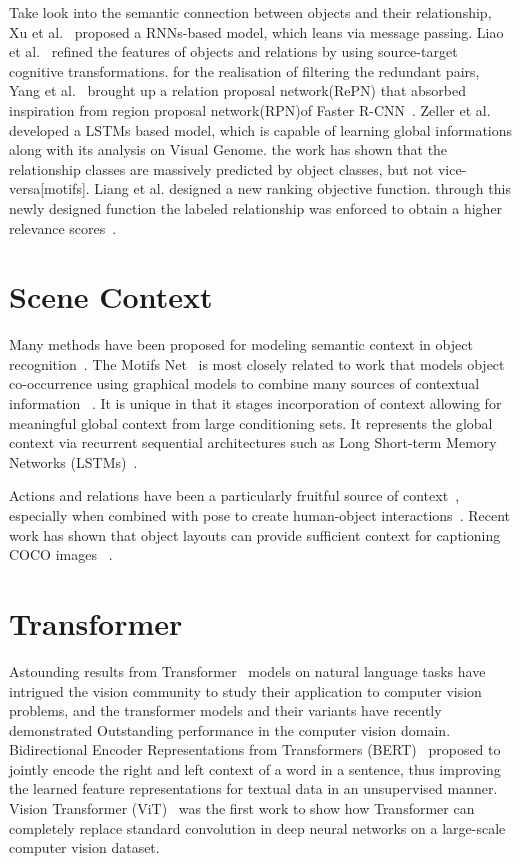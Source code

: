 Take look into the semantic connection between objects and their relationship, Xu et al.~\cite{xu2017scene} proposed a RNNs-based model,  which leans via message passing. Liao et al.~\cite{liao2019exploring} refined the features of objects and relations by using source-target cognitive transformations. for the realisation of filtering the redundant pairs, Yang et al.~\cite{yang2018graph} brought up a relation proposal network(RePN) that absorbed inspiration from region proposal network(RPN)of Faster R-CNN~\cite{ren2016faster}. Zeller et al.~\cite{zellers2018neural} developed a LSTMs based model, which is capable of learning global informations along with its analysis on Visual Genome. the work has shown that the relationship classes are massively predicted by object classes, but not vice-versa[motifs]. Liang et al. designed a new ranking objective function. through this newly designed function the labeled relationship was enforced to obtain a higher relevance scores~\cite{liang2018visual}.

\section{Scene Context}
Many methods have been proposed for modeling semantic context in object recognition~\cite{divvala2009empirical}. The Motifs Net~\cite{zellers2018neural} is most closely related to work that models object co-occurrence using graphical models to combine many sources of contextual information ~\cite{rabinovich2007objects,belongie2007context}. It is unique in that it stages incorporation of context allowing for meaningful global context from large conditioning sets. It represents the global context via recurrent sequential architectures such as Long Short-term Memory Networks (LSTMs)~\cite{hochreiter1997long}.

Actions and relations have been a particularly fruitful source of context~\cite{marszalek2009actions,gupta2015visual}, especially when combined with pose to create human-object interactions~\cite{yao2010modeling}. Recent work has shown that object layouts can provide sufficient context for captioning COCO images ~\cite{lin2014microsoft}.

\section{Transformer}
Astounding results from Transformer~\cite{vaswani2017attention} models on natural language tasks have intrigued the vision community to study their application to computer vision problems, and the transformer models and their variants have recently demonstrated Outstanding performance in the computer vision domain. Bidirectional Encoder Representations from Transformers (BERT)~\cite{devlin2018bert} proposed to jointly encode the right and left context of a word in a sentence, thus improving the learned feature representations for textual data in an unsupervised manner. Vision Transformer (ViT)~\cite{dosovitskiy2020image} was the first work to show how Transformer can completely replace standard convolution in deep neural networks on a large-scale computer vision dataset. 